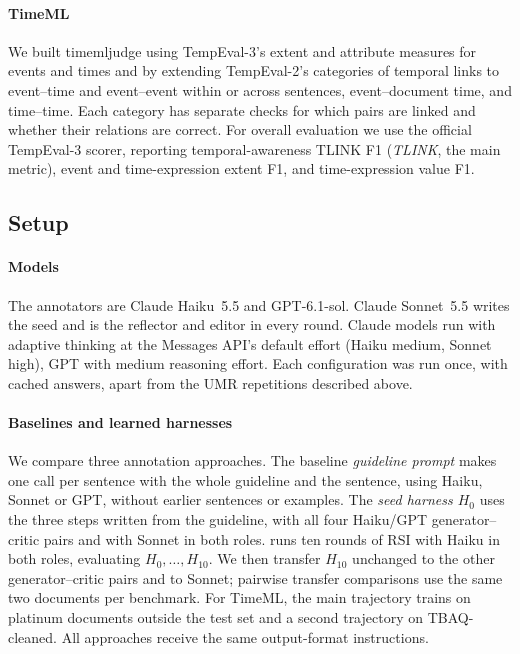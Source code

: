\paragraph{TimeML} We built timemljudge using TempEval-3's extent and attribute measures for events and times \citep{uzzaman2013semeval} and by extending TempEval-2's categories of temporal links \citep{verhagen2010semeval} to event--time and event--event within or across sentences, event--document time, and time--time. Each category has separate checks for which pairs are linked and whether their relations are correct. For overall evaluation we use the official TempEval-3 scorer, reporting temporal-awareness TLINK F1 (\emph{TLINK}, the main metric), event and time-expression extent F1, and time-expression value F1.

\subsection{Setup}

\paragraph{Models}
The annotators are Claude Haiku~5.5 and GPT-6.1-sol. Claude Sonnet~5.5 writes the seed and is the reflector and editor in every round. Claude models run with adaptive thinking at the Messages API's default effort (Haiku medium, Sonnet high), GPT with medium reasoning effort. Each configuration was run once, with cached answers, apart from the UMR repetitions described above.

\paragraph{Baselines and learned harnesses}
We compare three annotation approaches. The baseline \emph{guideline prompt} makes one call per sentence with the whole guideline and the sentence, using Haiku, Sonnet or GPT, without earlier sentences or examples. The \emph{seed harness $H_0$} uses the three steps written from the guideline, with all four Haiku/GPT generator--critic pairs and with Sonnet in both roles. \emph{\sys} runs ten rounds of RSI with Haiku in both roles, evaluating $H_0,\ldots,H_{10}$. We then transfer $H_{10}$ unchanged to the other generator--critic pairs and to Sonnet; pairwise transfer comparisons use the same two documents per benchmark. For TimeML, the main trajectory trains on platinum documents outside the test set and a second trajectory on TBAQ-cleaned. All approaches receive the same output-format instructions.

